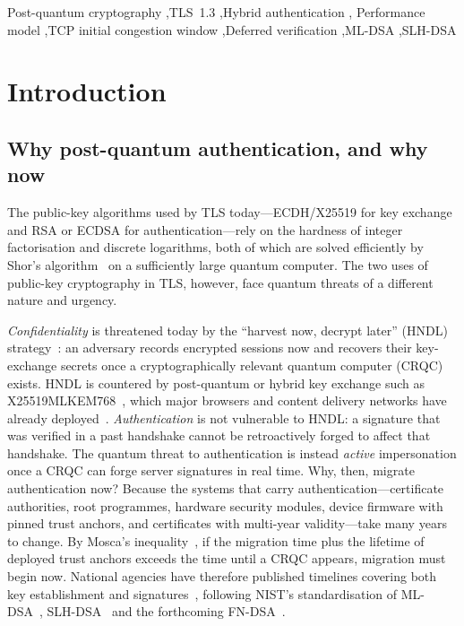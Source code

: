 \documentclass[preprint,10pt,3p]{elsarticle}
\begin{document}
\begin{frontmatter}
\begin{keyword}
Post-quantum cryptography \sep TLS~1.3 \sep Hybrid authentication \sep
Performance model \sep TCP initial congestion window \sep Deferred
verification \sep ML-DSA \sep SLH-DSA
\end{keyword}
\end{frontmatter}

\section{Introduction}
\label{sec:intro}

\subsection{Why post-quantum authentication, and why now}

The public-key algorithms used by TLS today---ECDH/X25519 for key exchange
and RSA or ECDSA for authentication---rely on the hardness of integer
factorisation and discrete logarithms, both of which are solved efficiently
by Shor's algorithm~\cite{Shor1994} on a sufficiently large quantum
computer.  The two uses of public-key cryptography in TLS, however, face
quantum threats of a different nature and urgency.

\emph{Confidentiality} is threatened today by the ``harvest now, decrypt
later'' (HNDL) strategy~\cite{Alnahawi2024}: an adversary records encrypted
sessions now and recovers their key-exchange secrets once a
cryptographically relevant quantum computer (CRQC) exists.  HNDL is
countered by post-quantum or hybrid key exchange such as
X25519MLKEM768~\cite{ECDHEMLKEM,FIPS203}, which major browsers and content
delivery networks have already deployed~\cite{Kwiatkowski2019}.
\emph{Authentication} is not vulnerable to HNDL: a signature that was
verified in a past handshake cannot be retroactively forged to affect that
handshake.  The quantum threat to authentication is instead \emph{active}
impersonation once a CRQC can forge server signatures in real time.  Why,
then, migrate authentication now?  Because the systems that carry
authentication---certificate authorities, root programmes, hardware
security modules, device firmware with pinned trust anchors, and
certificates with multi-year validity---take many years to change.  By
Mosca's inequality~\cite{Mosca2018}, if the migration time plus the
lifetime of deployed trust anchors exceeds the time until a CRQC appears,
migration must begin now.  National agencies have therefore published
timelines covering both key establishment and
signatures~\cite{NSA2022,ENISA2023,NCSC2024}, following NIST's
standardisation of ML-DSA~\cite{FIPS204}, SLH-DSA~\cite{FIPS205} and the
forthcoming FN-DSA~\cite{FIPS206Draft}.
\end{document}
